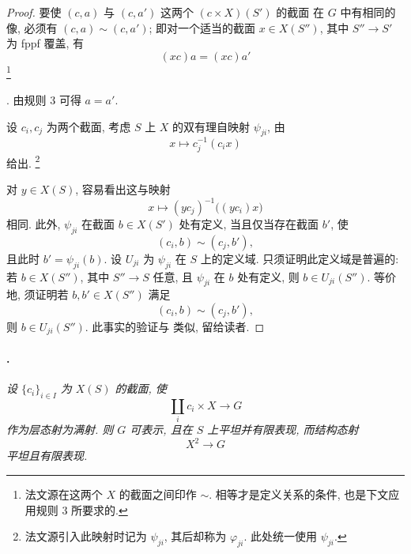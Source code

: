 \begin{proof}
\textup{}
要使 \((c,a)\) 与 \((c,a')\) 这两个 \((c\times X)(S')\) 的截面
在 \(G\) 中有相同的像,
必须有 \((c,a)\sim(c,a')\);
即对一个适当的截面 \(x\in X(S'')\), 其中 \(S''\to S'\) 为 fppf 覆盖, 有
\[
  (xc)a=(xc)a'
\]
\begingroup
\renewcommand{\thefootnote}{\ensuremath{\dagger}}\footnote{法文源在这两个 \(X\) 的截面之间印作 \(\sim\).
相等才是定义关系的条件, 也是下文应用规则 3 所要求的.}
\addtocounter{footnote}{-1}
\endgroup.
由规则 3 可得 \(a=a'\).

\textup{}
设 \(c_i,c_j\) 为两个截面, 考虑 \(S\) 上 \(X\) 的双有理自映射 \(\psi_{ji}\), 由
\[
  x\longmapsto c_j^{-1}(c_i x)
\]
给出.
\begingroup
\renewcommand{\thefootnote}{\ensuremath{\ddagger}}\footnote{法文源引入此映射时记为 \(\psi_{ji}\),
其后却称为 \(\varphi_{ji}\). 此处统一使用 \(\psi_{ji}\).}
\addtocounter{footnote}{-1}
\endgroup
对 \(y\in X(S)\), 容易看出这与映射
\[
  x\longmapsto (yc_j)^{-1}\bigl((yc_i)x\bigr)
\]
相同.
此外, \(\psi_{ji}\) 在截面 \(b\in X(S')\) 处有定义,
当且仅当存在截面 \(b'\), 使
\[
  (c_i,b)\sim(c_j,b'),
\]
且此时 \(b'=\psi_{ji}(b)\).
设 \(U_{ji}\) 为 \(\psi_{ji}\) 在 \(S\) 上的定义域.
只须证明此定义域是普遍的:
若 \(b\in X(S'')\), 其中 \(S''\to S\) 任意,
且 \(\psi_{ji}\) 在 \(b\) 处有定义, 则 \(b\in U_{ji}(S'')\).
等价地, 须证明若 \(b,b'\in X(S'')\) 满足
\[
  (c_i,b)\sim(c_j,b'),
\]
则 \(b\in U_{ji}(S'')\).
此事实的验证与 类似, 留给读者.
\end{proof}

\paragraph{.}
\textit{设 \(\{c_i\}_{i\in I}\) 为 \(X(S)\) 的截面, 使
\[
  \coprod_i c_i\times X\longrightarrow G
\]
作为层态射为满射.
则 \(G\) 可表示, 且在 \(S\) 上平坦并有限表现, 而结构态射
\[
  X^2\longrightarrow G
\]
平坦且有限表现.}

